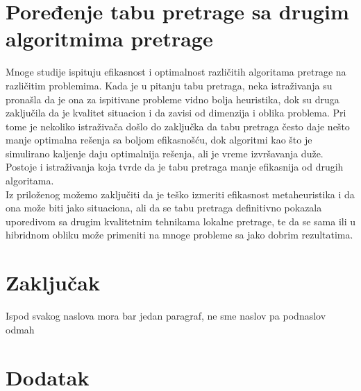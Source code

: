 \documentclass[a4paper]{article}
\begin{document}
\section{Poređenje tabu pretrage sa drugim algoritmima pretrage}
Mnoge studije ispituju efikasnost i optimalnost različitih algoritama pretrage na različitim problemima. Kada je u pitanju tabu pretraga, neka istraživanja su pronašla da je ona za ispitivane probleme vidno bolja heuristika, \cite{comptabubetter} dok su druga zaključila da je kvalitet situacion i da zavisi od dimenzija i oblika problema. \cite{comptabusimilar}\cite{comptabugoodperformance} Pri tome je nekoliko istraživača došlo do zaključka da tabu pretraga često daje nešto manje optimalna rešenja sa boljom efikasnošću, dok algoritmi kao što je simulirano kaljenje daju optimalnija rešenja, ali je vreme izvršavanja duže. \cite{comptabubettertimeworseresult} Postoje i istraživanja koja tvrde da je tabu pretraga manje efikasnija od drugih algoritama. \cite{comptabuworse}\\

Iz priloženog možemo zaključiti da je teško izmeriti efikasnost metaheuristika i da ona može biti jako situaciona, ali da se tabu pretraga definitivno pokazala uporedivom sa drugim kvalitetnim tehnikama lokalne pretrage, te da se sama ili u hibridnom obliku može primeniti na mnoge probleme sa jako dobrim rezultatima.

\section{Zaključak}
Ispod svakog naslova mora bar jedan paragraf, ne sme naslov pa podnaslov odmah


\appendix
{}



\appendix
\section{Dodatak}
\end{document}
